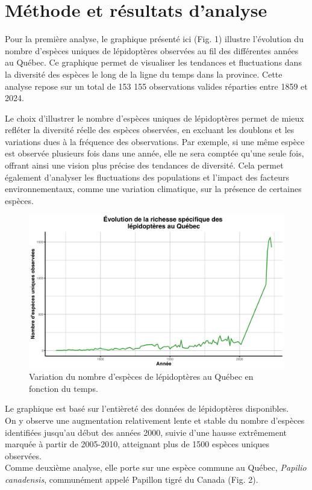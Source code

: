 \documentclass[9pt,twocolumn,twoside,]{pnas-new}
\begin{document}
\section{Méthode et résultats
d'analyse}\label{muxe9thode-et-ruxe9sultats-danalyse}

Pour la première analyse, le graphique présenté ici (Fig. 1) illustre
l'évolution du nombre d'espèces uniques de lépidoptères observées au fil
des différentes années au Québec. Ce graphique permet de visualiser les
tendances et fluctuations dans la diversité des espèces le long de la
ligne du temps dans la province. Cette analyse repose sur un total de
153 155 observations valides réparties entre 1859 et 2024.

Le choix d'illustrer le nombre d'espèces uniques de lépidoptères permet
de mieux refléter la diversité réelle des espèces observées, en excluant
les doublons et les variations dues à la fréquence des observations. Par
exemple, si une même espèce est observée plusieurs fois dans une année,
elle ne sera comptée qu'une seule fois, offrant ainsi une vision plus
précise des tendances de diversité. Cela permet également d'analyser les
fluctuations des populations et l'impact des facteurs environnementaux,
comme une variation climatique, sur la présence de certaines espèces.

\begin{figure}
\includegraphics[width=1\linewidth]{graphique_biodiversite} \caption{Variation du nombre d'espèces de lépidoptères au Québec en fonction du temps.}\label{fig:fig_graphique_biodiversite}
\end{figure}

Le graphique est basé sur l'entièreté des données de lépidoptères
disponibles.\\
On y observe une augmentation relativement lente et stable du nombre
d'espèces identifiées jusqu'au début des années 2000, suivie d'une
hausse extrêmement marquée à partir de 2005-2010, atteignant plus de
1500 espèces uniques observées.\\
Comme deuxième analyse, elle porte sur une espèce commune au Québec,
\emph{Papilio canadensis}, communément appelé Papillon tigré du Canada
(Fig. 2).
\end{document}
